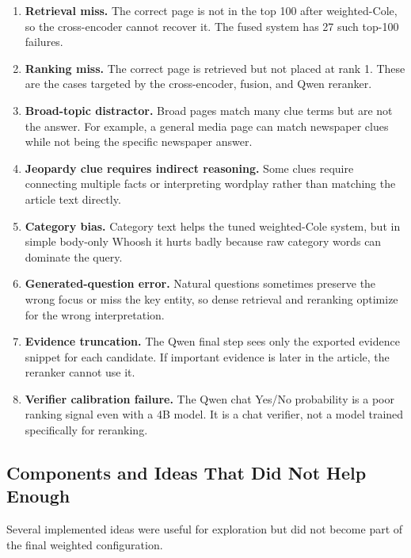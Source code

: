 \documentclass[11pt]{article}
\begin{document}
\begin{enumerate}[leftmargin=*]
  \item \textbf{Retrieval miss.} The correct page is not in the top 100 after weighted-Cole, so the cross-encoder cannot recover it. The fused system has 27 such top-100 failures.
  \item \textbf{Ranking miss.} The correct page is retrieved but not placed at rank 1. These are the cases targeted by the cross-encoder, fusion, and Qwen reranker.
  \item \textbf{Broad-topic distractor.} Broad pages match many clue terms but are not the answer. For example, a general media page can match newspaper clues while not being the specific newspaper answer.
  \item \textbf{Jeopardy clue requires indirect reasoning.} Some clues require connecting multiple facts or interpreting wordplay rather than matching the article text directly.
  \item \textbf{Category bias.} Category text helps the tuned weighted-Cole system, but in simple body-only Whoosh it hurts badly because raw category words can dominate the query.
  \item \textbf{Generated-question error.} Natural questions sometimes preserve the wrong focus or miss the key entity, so dense retrieval and reranking optimize for the wrong interpretation.
  \item \textbf{Evidence truncation.} The Qwen final step sees only the exported evidence snippet for each candidate. If important evidence is later in the article, the reranker cannot use it.
  \item \textbf{Verifier calibration failure.} The Qwen chat Yes/No probability is a poor ranking signal even with a 4B model. It is a chat verifier, not a model trained specifically for reranking.
\end{enumerate}

\subsection{Components and Ideas That Did Not Help Enough}

Several implemented ideas were useful for exploration but did not become part of the final weighted configuration.
\end{document}
